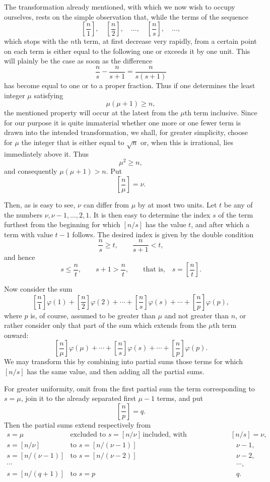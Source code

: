 \documentclass[11pt]{article}
\newcommand{\floor}[1]{\left[#1\right]}
\begin{document}
The transformation already mentioned, with which we now wish to occupy ourselves, rests on the simple observation that, while the terms of the sequence
\[
 \floor{\frac n1},\quad \floor{\frac n2},\quad \ldots,\quad \floor{\frac ns},\quad \ldots,
\]
which stops with the $n$th term, at first decrease very rapidly, from a certain point on each term is either equal to the following one or exceeds it by one unit. This will plainly be the case as soon as the difference
\[
 \frac ns-\frac n{s+1}=\frac{n}{s(s+1)}
\]
has become equal to one or to a proper fraction. Thus if one determines the least integer $\mu$ satisfying
\[
 \mu(\mu+1)\geq n,
\]
the mentioned property will occur at the latest from the $\mu$th term inclusive. Since for our purpose it is quite immaterial whether one more or one fewer term is drawn into the intended transformation, we shall, for greater simplicity, choose for $\mu$ the integer that is either equal to $\sqrt n$ or, when this is irrational, lies immediately above it. Thus
\[
 \mu^2\geq n,
\]
and consequently $\mu(\mu+1)>n$. Put
\[
 \floor{\frac n\mu}=\nu.
\]

Then, as is easy to see, $\nu$ can differ from $\mu$ by at most two units. Let $t$ be any of the numbers $\nu,\nu-1,\ldots,2,1$. It is then easy to determine the index $s$ of the term furthest from the beginning for which $\floor{n/s}$ has the value $t$, and after which a term with value $t-1$ follows. The desired index is given by the double condition
\[
 \frac ns\geq t,
 \qquad \frac n{s+1}<t,
\]
and hence
\[
 s\leq \frac nt,
 \qquad s+1>\frac nt,
 \qquad \text{that is,}\quad s=\floor{\frac nt}.
\]

Now consider the sum
\[
 \floor{\frac n1}\varphi(1)+\floor{\frac n2}\varphi(2)+\cdots+
 \floor{\frac ns}\varphi(s)+\cdots+
 \floor{\frac np}\varphi(p),
\]
where $p$ is, of course, assumed to be greater than $\mu$ and not greater than $n$, or rather consider only that part of the sum which extends from the $\mu$th term onward:
\[
 \floor{\frac n\mu}\varphi(\mu)+\cdots+\floor{\frac ns}\varphi(s)+\cdots+\floor{\frac np}\varphi(p).
\]
We may transform this by combining into partial sums those terms for which $\floor{n/s}$ has the same value, and then adding all the partial sums.

For greater uniformity, omit from the first partial sum the term corresponding to $s=\mu$, join it to the already separated first $\mu-1$ terms, and put
\[
 \floor{\frac np}=q.
\]
Then the partial sums extend respectively from
\[
\begin{array}{llll}
s=\mu & \text{excluded to } s=\floor{n/\nu} & \text{included, with corresponding value } \floor{n/s}=\nu,\\[0.4em]
s=\floor{n/\nu} & \text{to } s=\floor{n/(\nu-1)} && \nu-1,\\[0.4em]
s=\floor{n/(\nu-1)} & \text{to } s=\floor{n/(\nu-2)} && \nu-2,\\
\cdots &&& \cdots,\\[0.4em]
s=\floor{n/(q+1)} & \text{to } s=p && q.
\end{array}
\]
\end{document}
